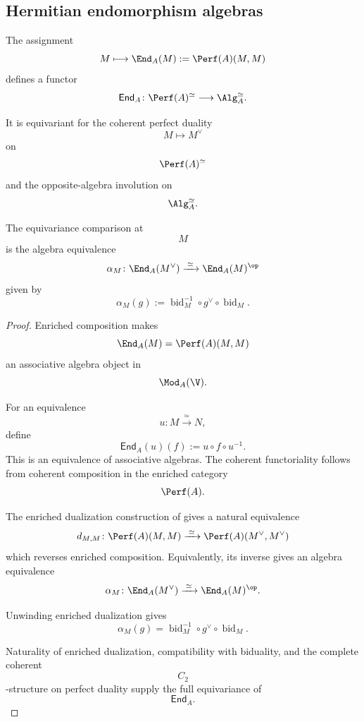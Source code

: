 \subsection{Hermitian endomorphism algebras}

\begin{proposition}
\label{prop:endomorphism-algebra-equivariance}
The assignment
\[
    M
    \longmapsto
    \End_A(M)
    :=
    \Perf(A)(M,M)
\]
defines a functor
\[
    \mathsf{End}_A
    \colon
    \Perf(A)^\simeq
    \longrightarrow
    \Alg_A^\simeq.
\]

It is equivariant for the coherent perfect duality
\[
    M
    \longmapsto
    M^\vee
\]
on
\[
    \Perf(A)^\simeq
\]
and the opposite-algebra involution on
\[
    \Alg_A^\simeq.
\]

The equivariance comparison at
\[
    M
\]
is the algebra equivalence
\[
    \alpha_M
    \colon
    \End_A(M^\vee)
    \xrightarrow{\;\simeq\;}
    \End_A(M)^{\op}
\]
given by
\[
    \alpha_M(g)
    :=
    \operatorname{bid}_M^{-1}
    \circ
    g^\vee
    \circ
    \operatorname{bid}_M.
\]
\end{proposition}

\begin{proof}
Enriched composition makes
\[
    \End_A(M)
    =
    \Perf(A)(M,M)
\]
an associative algebra object in
\[
    \Mod_A(\V).
\]

For an equivalence
\[
    u
    \colon
    M
    \xrightarrow{\;\simeq\;}
    N,
\]
define
\[
    \mathsf{End}_A(u)(f)
    :=
    u\circ f\circ u^{-1}.
\]
This is an equivalence of associative algebras. The coherent
functoriality follows from coherent composition in the enriched
category
\[
    \Perf(A).
\]

The enriched dualization construction of
gives a natural equivalence
\[
    d_{M,M}
    \colon
    \Perf(A)(M,M)
    \xrightarrow{\;\simeq\;}
    \Perf(A)(M^\vee,M^\vee)
\]
which reverses enriched composition. Equivalently, its inverse gives an
algebra equivalence
\[
    \alpha_M
    \colon
    \End_A(M^\vee)
    \xrightarrow{\;\simeq\;}
    \End_A(M)^{\op}.
\]

Unwinding enriched dualization gives
\[
    \alpha_M(g)
    =
    \operatorname{bid}_M^{-1}
    \circ
    g^\vee
    \circ
    \operatorname{bid}_M.
\]

Naturality of enriched dualization, compatibility with biduality, and
the complete coherent
\[
    C_2
\]
-structure on perfect duality supply the full equivariance of
\[
    \mathsf{End}_A.
\]
\end{proof}

